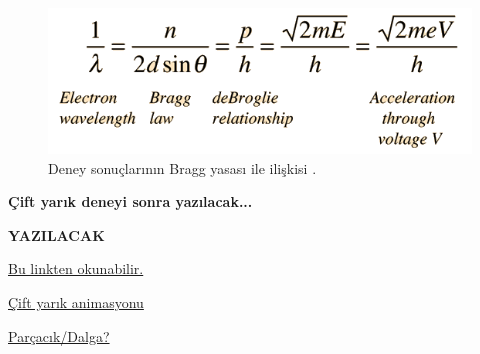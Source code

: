 \documentclass[a4paper,12pt, twoside]{article}
\newcommand{\YAZILACAK}{{\vspace{18pt}\bf\Large \color{red} YAZILACAK}}
\begin{document}
\begin{figure}[hbtp]
\begin{minipage}{0.35\textwidth}
\vspace{24pt}

\includegraphics[scale=.4]{davisson_germer_hyperphysics_bragg.png}
\caption{\label{fig:davisson_germer5} Deney sonuçlarının Bragg yasası ile ilişkisi \cite{web:hyperphysics_davisson_germer1}.}
\end{minipage}
\end{figure}


\vspace{24pt}

{\bf Çift yarık deneyi sonra yazılacak...}

\YAZILACAK

\href{https://tr.wikipedia.org/wiki/%C3%87ift_yar%C4%B1k_deneyi}{Bu linkten okunabilir. }

\href{https://youtu.be/qCmtegdqOOA}{Çift yarık animasyonu}

\href{https://youtu.be/O81Cilon10M}{Parçacık/Dalga?}

	
\end{document}
